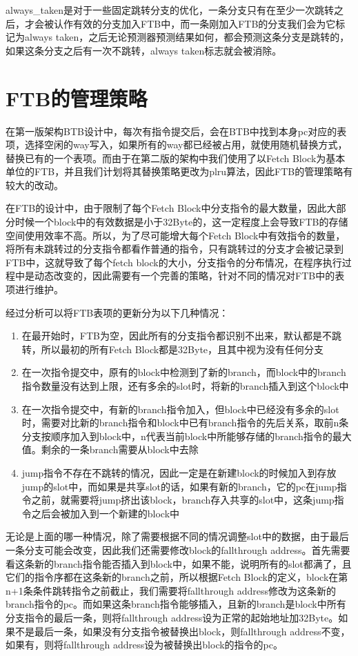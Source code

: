 always\_taken是对于一些固定跳转分支的优化，一条分支只有在至少一次跳转之后，才会被认作有效的分支加入FTB中，而一条刚加入FTB的分支我们会为它标记为always taken，之后无论预测器预测结果如何，都会预测这条分支是跳转的，如果这条分支之后有一次不跳转，always taken标志就会被消除。

\section{FTB的管理策略}

在第一版架构BTB设计中，每次有指令提交后，会在BTB中找到本身pc对应的表项，选择空闲的way写入，如果所有的way都已经被占用，就使用随机替换方式，替换已有的一个表项。而由于在第二版的架构中我们使用了以Fetch Block为基本单位的FTB，并且我们计划将其替换策略更改为plru算法，因此FTB的管理策略有较大的改动。

在FTB的设计中，由于限制了每个Fetch Block中分支指令的最大数量，因此大部分时候一个block中的有效数据是小于32Byte的，这一定程度上会导致FTB的存储空间使用效率不高。所以，为了尽可能增大每个Fetch Block中有效指令的数量，将所有未跳转过的分支指令都看作普通的指令，只有跳转过的分支才会被记录到FTB中，这就导致了每个fetch block的大小，分支指令的分布情况，在程序执行过程中是动态改变的，因此需要有一个完善的策略，针对不同的情况对FTB中的表项进行维护。

经过分析可以将FTB表项的更新分为以下几种情况：

\begin{enumerate}
	\item 在最开始时，FTB为空，因此所有的分支指令都识别不出来，默认都是不跳转，所以最初的所有Fetch Block都是32Byte，且其中视为没有任何分支
	\item 在一次指令提交中，原有的block中检测到了新的branch，而block中的branch指令数量没有达到上限，还有多余的slot时，将新的branch插入到这个block中
	\item 在一次指令提交中，有新的branch指令加入，但block中已经没有多余的slot时，需要对比新的branch指令和block中已有branch指令的先后关系，取前n条分支按顺序加入到block中，n代表当前block中所能够存储的branch指令的最大值。剩余的一条branch需要从block中去除
	\item jump指令不存在不跳转的情况，因此一定是在新建block的时候加入到存放jump的slot中，而如果是共享slot的话，如果有新的branch，它的pc在jump指令之前，就需要将jump挤出该block，branch存入共享的slot中，这条jump指令之后会被加入到一个新建的block中
\end{enumerate}


无论是上面的哪一种情况，除了需要根据不同的情况调整slot中的数据，由于最后一条分支可能会改变，因此我们还需要修改block的fallthrough address。首先需要看这条新的branch指令能否插入到block中，如果不能，说明所有的slot都满了，且它们的指令序都在这条新的branch之前，所以根据Fetch Block的定义，block在第n+1条条件跳转指令之前截止，我们需要将fallthrough address修改为这条新的branch指令的pc。而如果这条branch指令能够插入，且新的branch是block中所有分支指令的最后一条，则将fallthrough address设为正常的起始地址加32Byte。如果不是最后一条，如果没有分支指令被替换出block，则fallthrough address不变，如果有，则将fallthrough address设为被替换出block的指令的pc。

